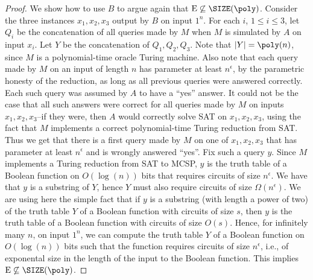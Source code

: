 \begin{proof}
We show how to use $B$ to argue again that $\mathrm E\not\subseteq\SIZE(\poly)$. Consider the three instances $x_1,x_2,x_3$ output by $B$ on input $1^n$. For each $i$, $1\leq i\leq3$, let $Q_i$ be the concatenation of all queries made by $M$ when $M$ is simulated by $A$ on input $x_i$. Let $Y$ be the concatenation of $Q_1,Q_2,Q_3$. Note that $|Y|=\poly(n)$, since $M$ is a polynomial-time oracle Turing machine. Also note that each query made by $M$ on an input of length $n$ has parameter at least $n^\epsilon$, by the parametric honesty of the reduction, as long as all previous queries were answered correctly. Each such query was assumed by $A$ to have a ``yes'' answer. It could not be the case that all such answers were correct for all queries made by $M$ on inputs $x_1,x_2,x_3$--if they were, then $A$ would correctly solve SAT on $x_1,x_2,x_3$, using the fact that $M$ implements a correct polynomial-time Turing reduction from SAT.
Thus we get that there is a first query made by $M$ on one of $x_1,x_2,x_3$ that has parameter at least $n^\epsilon$ and is wrongly answered ``yes''. Fix such a query $y$. Since $M$ implements a Turing reduction from SAT to MCSP, $y$ is the truth table of a Boolean function on $O(\log(n))$ bits that requires circuits of size $n^\epsilon$. We have that $y$ is a substring of $Y$, hence $Y$ must also require circuits of size $\Omega(n^\epsilon)$. We are using here the simple fact that if $y$ is a substring (with length a power of two) of the truth table $Y$ of a Boolean function with circuits of size $s$, then $y$ is the truth table of a Boolean function with circuits of size $O(s)$.
Hence, for infinitely many $n$, on input $1^n$, we can compute the truth table $Y$ of a Boolean function on $O(\log(n))$ bits such that the function requires circuits of size $n^\epsilon$, i.e., of exponental size in the length of the input to the Boolean function. This implies $\mathrm E\not\subseteq\SIZE(\poly)$.
\end{proof}
